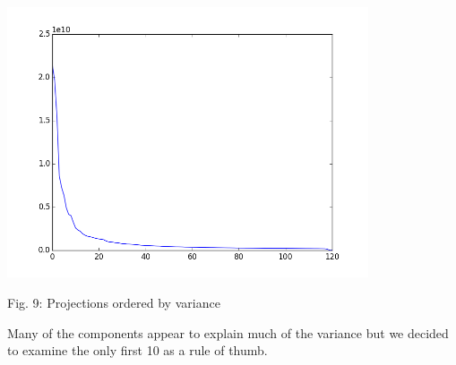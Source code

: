 \documentclass[12pt]{article}
\begin{document}
\begin{housevseverything}
    \centering
      \includegraphics[width=0.8\textwidth]{components_variance}
\end{housevseverything}

Fig. 9: Projections ordered by variance

Many of the  components appear to explain much of the variance but we decided 
to examine the only first 10 as a rule of thumb.
\end{document}
